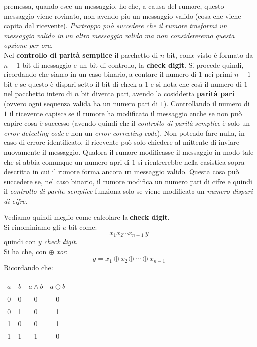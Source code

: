 \documentclass[a4paper,12pt, oneside]{book}
\begin{document}
\begin{definizione}
  premessa, quando esce un messaggio, ho che, a causa del rumore, questo
  messaggio viene rovinato, non avendo più un messaggio
  valido (cosa che viene capita dal ricevente). \textit{Purtroppo può succedere
    che il rumore trasformi un messaggio valido in un altro messaggio valido ma
    non considereremo questa opzione per ora}. \\
  Nel \textbf{controllo di parità semplice} il pacchetto di $n$ bit, come visto
  è formato da $n-1$ bit di messaggio e un bit di controllo, la \textbf{check
    digit}. Si procede quindi, ricordando che siamo in un caso binario, a
  contare il numero di $1$ nei primi $n-1$ bit e se questo è dispari setto il
  bit di check a $1$ e si nota che così il numero di $1$ nel pacchetto intero
  di $n$ bit diventa pari, avendo la cosiddetta \textbf{parità pari} (ovvero
  ogni sequenza valida ha un numero pari di $1$). Controllando il numero di $1$
  il ricevente capisce se il rumore ha modificato il messaggio anche se non può
  capire cosa è successo (avendo quindi che il \emph{controllo di parità
    semplice} è solo un \emph{error detecting code} e non un \emph{error
    correcting code}). Non potendo fare nulla, in caso di errore identificato,
  il ricevente può solo chiedere al mittente di inviare nuovamente il messaggio.
  Qualora il rumore modificasse il messaggio in modo tale che si abbia comunque
  un numero apri di $1$ si rientrerebbe nella casistica sopra descritta in cui
  il rumore forma ancora un messaggio valido. Questa cosa può succedere se, nel
  caso binario, il rumore modifica un numero pari di cifre e quindi il
  \emph{controllo di parità semplice} funziona solo se viene modificato un
  \emph{numero dispari di cifre}.
  
\end{definizione}
Vediamo quindi meglio come calcolare la \textbf{check digit}.\\
Si rinominiamo gli $n$ bit come:
\[x_1x_2\cdots x_{n-1}\,y\]
quindi con $y$ \textit{check digit}.\\
Si ha che, con $\oplus$ \textit{xor}:
\[y=x_1\oplus x_2\oplus\cdots\oplus x_{n-1}\]
Ricordando che:
\begin{table}[H]
  \centering
  \begin{tabular}{c|c|c|c}
    $a$& $b$ & $a\land b$& $a\oplus b$\\
    \hline
    0 & 0 & 0 &0\\
    0 & 1 & 0 & 1\\
    1 & 0 & 0 &1\\
    1 & 1 & 1 & 0\\    
  \end{tabular}
\end{table}
\end{document}
